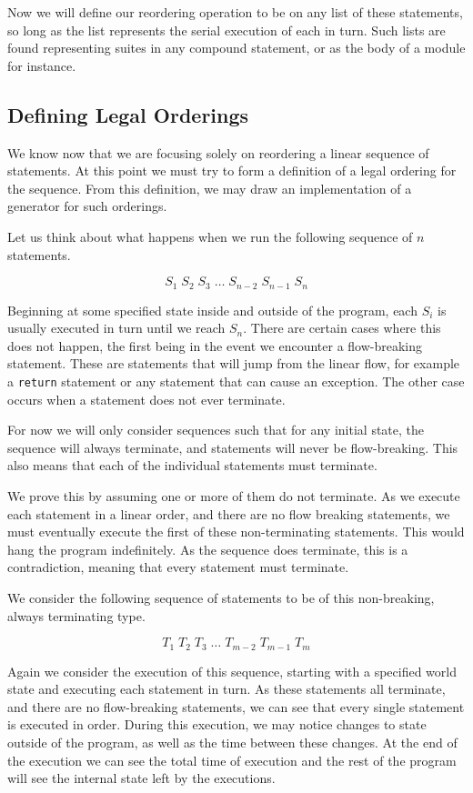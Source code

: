 \documentclass[twoside,a4paper]{report}
\begin{document}
Now we will define our reordering operation to be on any list of these statements, so long as the list represents the serial execution of each in turn.
Such lists are found representing suites in any compound statement, or as the body of a module for instance.

\subsection{Defining Legal Orderings}

We know now that we are focusing solely on reordering a linear sequence of statements. At this point we must try to form a definition of a legal ordering
for the sequence. From this definition, we may draw an implementation of a generator for such orderings.

Let us think about what happens when we run the following sequence of $n$ statements.

$$S_1 \; S_2 \; S_3 \; \ldots \; S_{n-2} \; S_{n-1} \; S_n$$

Beginning at some specified state inside and outside of the program, each $S_i$ is usually executed in turn until we reach $S_n$. There are certain cases where
this does not happen, the first being in the event we encounter a flow-breaking statement. These are statements that will jump from the linear flow, for
example a \texttt{return} statement or any statement that can cause an exception. The other case occurs when a statement does not ever terminate.

For now we will only consider sequences such that for any initial state, the sequence will always terminate, and statements will never be flow-breaking. This also
means that each of the individual statements must terminate.

We prove this by assuming one or more of them do not terminate. As we execute each statement in a linear
order, and there are no flow breaking statements, we must eventually execute the first of these non-terminating statements. This would hang
the program indefinitely. As the sequence does terminate, this is a contradiction, meaning that every statement must terminate.

We consider the following sequence of statements to be of this non-breaking, always terminating type.

$$T_1 \; T_2 \; T_3 \; \ldots \; T_{m-2} \; T_{m-1} \; T_m$$

Again we consider the execution of this sequence, starting with a specified world state and executing each statement in turn. As these statements all terminate,
and there are no flow-breaking statements, we can see that every single statement is executed in order. During this execution, we may notice changes to state
outside of the program, as well as the time between these changes. At the end of the execution we can see the total time of execution and the rest of the program
will see the internal state left by the executions.
\end{document}
